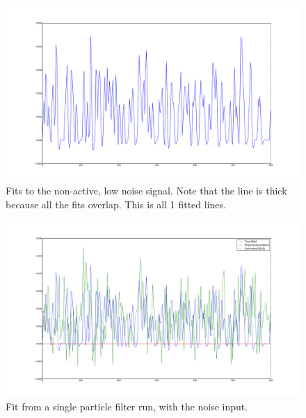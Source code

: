 \begin{figure}[H]
\includegraphics[clip=true,trim=6cm 3cm 6cm 3cm,width=16cm]{images/fits_noiseonly}
\caption{Fits to the non-active, low noise signal. Note that the line is thick because all
the fits overlap. This is all 1 fitted lines.}
\label{fig:fits_noiseonly}
\end{figure}

\begin{figure}[H]
\includegraphics[clip=true,trim=6cm 3cm 6cm 3cm,width=16cm]{images/justnoise_fit_0}
\caption{Fit from a single particle filter run, with the noise input. }
\label{fig:justnoise_fit_0}
\end{figure} %

